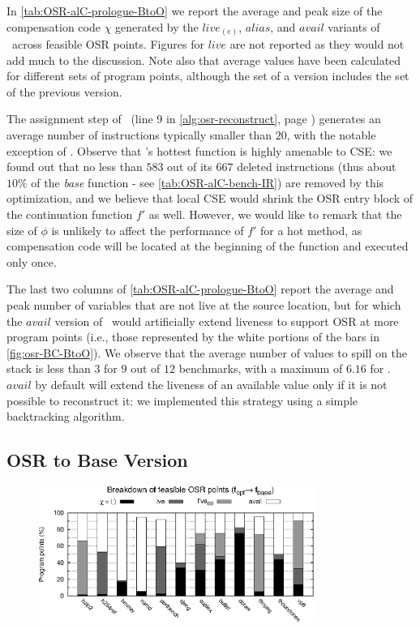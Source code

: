 In \mytable\ref{tab:OSR-alC-prologue-BtoO} we report the average and peak size of the compensation code $\chi$ generated by the $live_{(e)}$, $alias$, and $avail$ variants of \reconstruct\ across feasible OSR points. Figures for $live$ are not reported as they would not add much to the discussion. Note also that average values have been calculated for different sets of program points, although the set of a version includes the set of the previous version.

The assignment step of \reconstruct\ (line 9 in \myalgorithm\ref{alg:osr-reconstruct}, page \pageref{alg:osr-reconstruct}) generates an average number of instructions typically smaller than $20$, with the notable exception of . Observe that 's hottest function  is highly amenable to CSE: we found out that no less than $583$ out of its $667$ deleted instructions (thus about $10\%$ of the {\em base} function - see \mytable\ref{tab:OSR-alC-bench-IR}) are removed by this optimization, and we believe that local CSE would shrink the OSR entry block of the continuation function $f'$ as well. However, we would like to remark that the size of $\phi$ is unlikely to affect the performance of $f'$ for a hot method, as compensation code will be located at the beginning of the function and executed only once.

The last two columns of \mytable\ref{tab:OSR-alC-prologue-BtoO} report the average and peak number of variables that are not live at the source location, but for which the $avail$ version of \reconstruct\ would artificially extend liveness to support OSR at more program points (i.e., those represented by the white portions of the bars in \myfigure\ref{fig:osr-BC-BtoO}). We observe that the average number of values to spill on the stack is less than $3$ for $9$ out of $12$ benchmarks, with a maximum of $6.16$ for . $avail$ by default will extend the liveness of an available value only if it is not possible to reconstruct it: we implemented this strategy using a simple backtracking algorithm.

\subsection{OSR to Base Version}

\begin{figure}[!b]
\begin{center}
\includegraphics[width=0.8\textwidth]{figures/osr-BC-OtoB/osr-BC-OtoB.eps}
\caption{\protect}
\end{center}
\end{figure}

